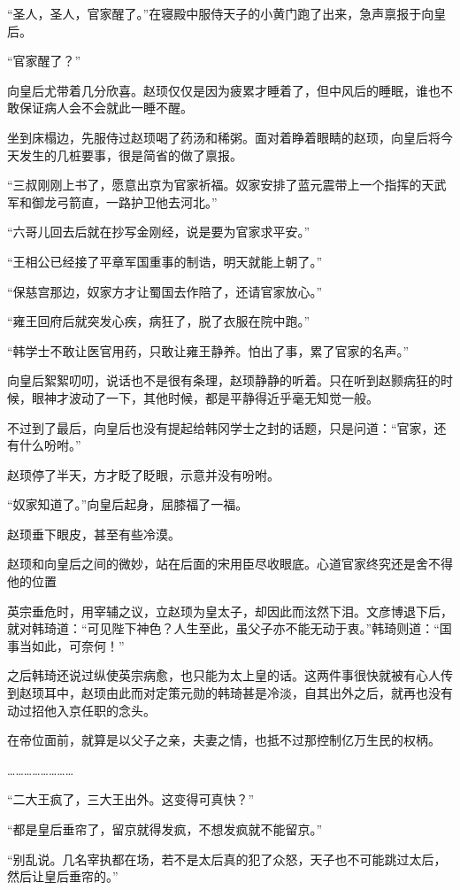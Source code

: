 “圣人，圣人，官家醒了。”在寝殿中服侍天子的小黄门跑了出来，急声禀报于向皇后。

“官家醒了？”

向皇后尤带着几分欣喜。赵顼仅仅是因为疲累才睡着了，但中风后的睡眠，谁也不敢保证病人会不会就此一睡不醒。

坐到床榻边，先服侍过赵顼喝了药汤和稀粥。面对着睁着眼睛的赵顼，向皇后将今天发生的几桩要事，很是简省的做了禀报。

“三叔刚刚上书了，愿意出京为官家祈福。奴家安排了蓝元震带上一个指挥的天武军和御龙弓箭直，一路护卫他去河北。”

“六哥儿回去后就在抄写金刚经，说是要为官家求平安。”

“王相公已经接了平章军国重事的制诰，明天就能上朝了。”

“保慈宫那边，奴家方才让蜀国去作陪了，还请官家放心。”

“雍王回府后就突发心疾，病狂了，脱了衣服在院中跑。”

“韩学士不敢让医官用药，只敢让雍王静养。怕出了事，累了官家的名声。”

向皇后絮絮叨叨，说话也不是很有条理，赵顼静静的听着。只在听到赵颢病狂的时候，眼神才波动了一下，其他时候，都是平静得近乎毫无知觉一般。

不过到了最后，向皇后也没有提起给韩冈学士之封的话题，只是问道：“官家，还有什么吩咐。”

赵顼停了半天，方才眨了眨眼，示意并没有吩咐。

“奴家知道了。”向皇后起身，屈膝福了一福。

赵顼垂下眼皮，甚至有些冷漠。

赵顼和向皇后之间的微妙，站在后面的宋用臣尽收眼底。心道官家终究还是舍不得他的位置

英宗垂危时，用宰辅之议，立赵顼为皇太子，却因此而泫然下泪。文彦博退下后，就对韩琦道：“可见陛下神色？人生至此，虽父子亦不能无动于衷。”韩琦则道：“国事当如此，可奈何！”

之后韩琦还说过纵使英宗病愈，也只能为太上皇的话。这两件事很快就被有心人传到赵顼耳中，赵顼由此而对定策元勋的韩琦甚是冷淡，自其出外之后，就再也没有动过招他入京任职的念头。

在帝位面前，就算是以父子之亲，夫妻之情，也抵不过那控制亿万生民的权柄。

……………………

“二大王疯了，三大王出外。这变得可真快？”

“都是皇后垂帘了，留京就得发疯，不想发疯就不能留京。”

“别乱说。几名宰执都在场，若不是太后真的犯了众怒，天子也不可能跳过太后，然后让皇后垂帘的。”

